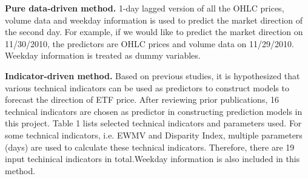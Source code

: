\documentclass[letterpaper]{article}
\begin{document}
\textbf{Pure data-driven method.} 1-day lagged version of all the OHLC prices,
volume data and weekday information is used to predict the market direction of
the second day. For example, if we would like to predict the market direction
on 11/30/2010, the predictors are OHLC prices and volume data on 11/29/2010.
Weekday information is treated as dummy variables.

\textbf{Indicator-driven method.} Based on previous studies, it is hypothesized
that various technical indicators can be used as predictors to construct models
to forecast the direction of ETF price. After reviewing prior
publications\cite{Fundreport, thesis, plosone, arXiv, trade}, 16 technical
indicators are chosen as predictor in constructing prediction models in this
project. Table 1 lists selected technical indicators and parameters used. For
some technical indicators, i.e. EWMV and Disparity Index, multiple parameters
(days) are used to calculate these technical indicators. Therefore, there are
19 input techinical indicators in total.Weekday information is also included in
this method.
\end{document}
